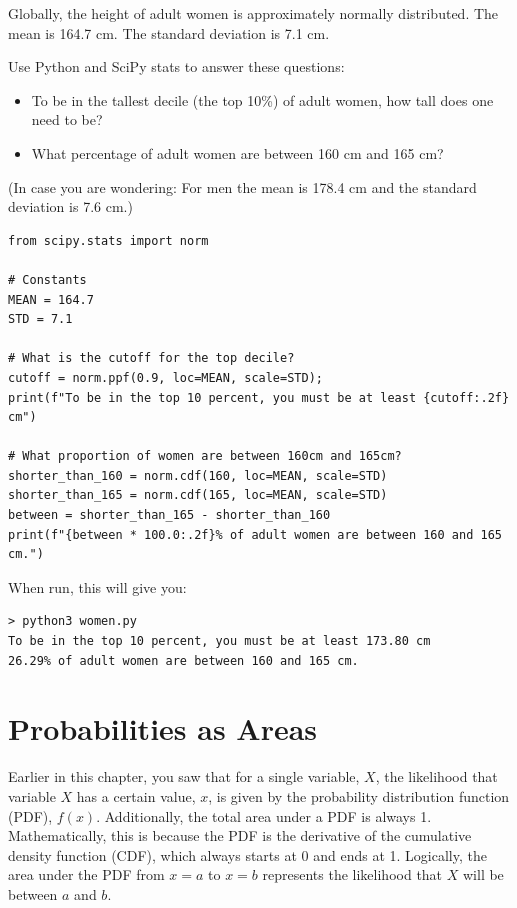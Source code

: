 \begin{Exercise}[title={SciPy Stats}, label=scipy_ppf]

Globally,  the height of adult women is approximately normally distributed. The mean is 164.7 cm. The standard deviation is 7.1 cm.

Use Python and SciPy stats to answer these questions: 

\begin{itemize}
\item To be in the tallest decile (the top 10\%) of adult women,  how tall does one need to be? 

\item What percentage of adult women are between 160 cm and 165 cm?

\end{itemize}

(In case you are wondering: For men the mean is 178.4 cm and the standard deviation is 7.6 cm.)

\end{Exercise}
\begin{Answer}[ref=scipy_ppf]

\begin{verbatim}
from scipy.stats import norm

# Constants
MEAN = 164.7 
STD = 7.1

# What is the cutoff for the top decile?
cutoff = norm.ppf(0.9, loc=MEAN, scale=STD);
print(f"To be in the top 10 percent, you must be at least {cutoff:.2f} cm")

# What proportion of women are between 160cm and 165cm?
shorter_than_160 = norm.cdf(160, loc=MEAN, scale=STD)
shorter_than_165 = norm.cdf(165, loc=MEAN, scale=STD)
between = shorter_than_165 - shorter_than_160
print(f"{between * 100.0:.2f}% of adult women are between 160 and 165 cm.")
\end{verbatim}

When run,  this will give you:

\begin{verbatim}
> python3 women.py
To be in the top 10 percent, you must be at least 173.80 cm
26.29% of adult women are between 160 and 165 cm.
\end{verbatim}

\end{Answer}

\section{Probabilities as Areas}
Earlier in this chapter, you saw that for 
a single variable, $X$, the likelihood that variable $X$ has a certain value, 
$x$, is given by the probability distribution function (PDF), $f(x)$. 
Additionally, the total area under a PDF is always 1. Mathematically, this is 
because the PDF is the derivative of the cumulative density function (CDF), 
which always starts at 0 and ends at 1. Logically, the area under the PDF from 
$x = a$ to $x = b$ represents the likelihood that $X$ will be between $a$ and 
$b$. 

